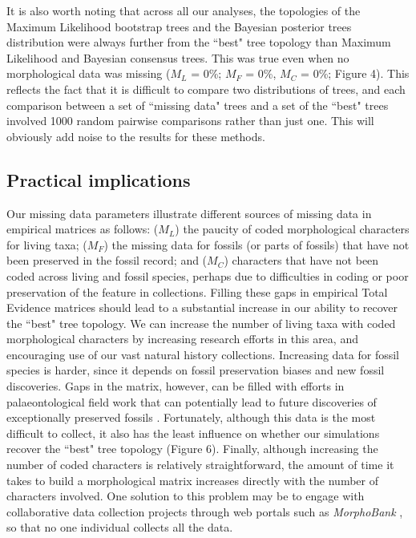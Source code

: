 \documentclass[12pt,letterpaper]{article}
\begin{document}
It is also worth noting that across all our analyses, the topologies of the Maximum Likelihood bootstrap trees and the Bayesian posterior trees distribution were always further from the ``best" tree topology than Maximum Likelihood and Bayesian consensus trees.
This was true even when no morphological data was missing ($M_{L}$ = 0\%; $M_{F}$ = 0\%, $M_{C}$ = 0\%; Figure 4).
This reflects the fact that it is difficult to compare two distributions of trees, and each comparison between a set of ``missing data" trees and a set of the ``best" trees involved 1000 random pairwise comparisons rather than just one.
This will obviously add noise to the results for these methods.

\subsection{Practical implications}
Our missing data parameters illustrate different sources of missing data in empirical matrices as follows: ($M_{L}$) the paucity of coded morphological characters for living taxa; ($M_{F}$) the missing data for fossils (or parts of fossils) that have not been preserved in the fossil record; and ($M_{C}$) characters that have not been coded across living and fossil species, perhaps due to difficulties in coding or poor preservation of the feature in collections.
Filling these gaps in empirical Total Evidence matrices should lead to a substantial increase in our ability to recover the ``best" tree topology.
We can increase the number of living taxa with coded morphological characters by increasing research efforts in this area, and encouraging use of our vast natural history collections.
Increasing data for fossil species is harder, since it depends on fossil preservation biases and new fossil discoveries.
Gaps in the matrix, however, can be filled with efforts in palaeontological field work that can potentially lead to future discoveries of exceptionally preserved fossils \citep[e.g.][]{nithe2013}.
Fortunately, although this data is the most difficult to collect, it also has the least influence on whether our simulations recover the ``best" tree topology (Figure 6).
Finally, although increasing the number of coded characters is relatively straightforward, the amount of time it takes to build a morphological matrix increases directly with the number of characters involved.
One solution to this problem may be to engage with collaborative data collection projects through web portals such as \textit{MorphoBank} \citep{morphobank}, so that no one individual collects all the data.
\end{document}
